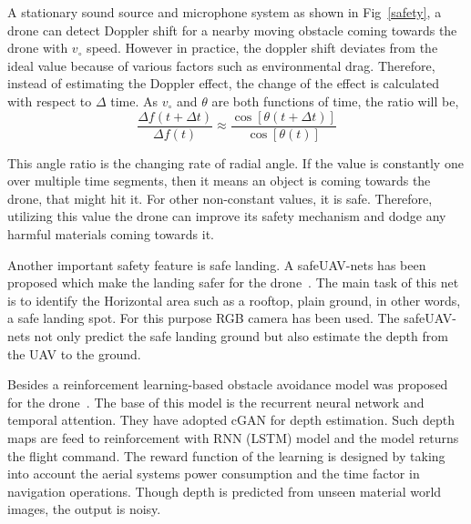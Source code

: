 
A stationary sound source and microphone system as shown in Fig~\ref{safety}, a drone can detect Doppler shift for a nearby moving obstacle coming towards the drone with $v_{\circ}$ speed. However in practice, the doppler shift deviates from the ideal value because of various factors such as environmental drag. Therefore, instead of estimating the Doppler effect, the change of the effect is calculated with respect to $\Delta $ time. As $v_{\circ}$ and $\theta$ are both functions of time, the ratio will be, $$\frac{\Delta f(t+\Delta t)}{\Delta f(t)} \approx \frac{\cos \left[ \theta(t+\Delta t)\right]}{\cos \left[\theta(t)\right]}$$

This angle ratio is the changing rate of radial angle. If the value is constantly one over multiple time segments, then it means an object is coming towards the drone, that might hit it. For other non-constant values, it is safe. Therefore, utilizing this value the drone can improve its safety mechanism and dodge any harmful materials coming towards it.

Another important safety feature is safe landing. A safeUAV-nets has been proposed which make the landing safer for the drone~\cite{marcu2018safeuav}. The main task of this net is to identify the Horizontal area such as a rooftop, plain ground, in other words, a safe landing spot. For this purpose RGB camera has been used. The safeUAV-nets not only predict the safe landing ground but also estimate the depth from the UAV to the ground.

Besides a reinforcement learning-based obstacle avoidance model was proposed for the drone~\cite{singla2019memory}. The base of this model is the recurrent neural network and temporal attention. They have adopted cGAN for depth estimation. Such depth maps are feed to reinforcement with RNN (LSTM) model and the model returns the flight command. The reward function of the learning is designed by taking into account the aerial systems power consumption and the time factor in navigation operations. Though depth is predicted from unseen material world images, the output is noisy.

